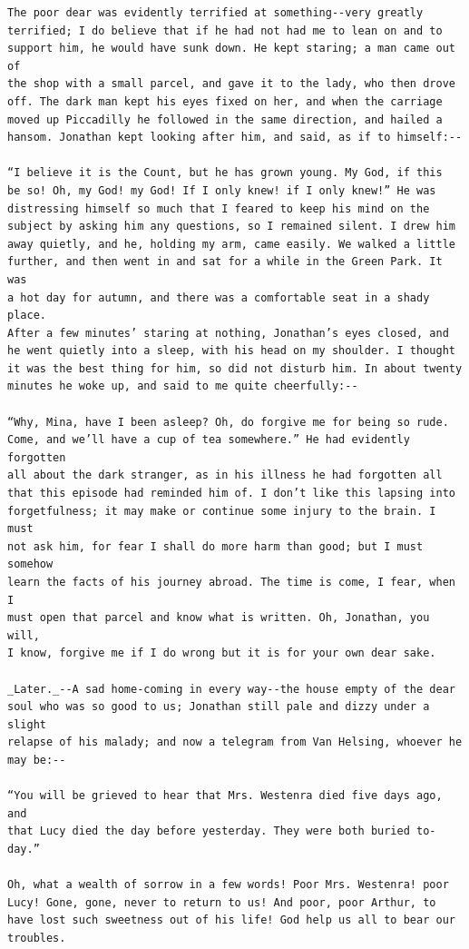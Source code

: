 \documentclass{article}
\begin{document}
\begin{verbatim}
The poor dear was evidently terrified at something--very greatly
terrified; I do believe that if he had not had me to lean on and to
support him, he would have sunk down. He kept staring; a man came out of
the shop with a small parcel, and gave it to the lady, who then drove
off. The dark man kept his eyes fixed on her, and when the carriage
moved up Piccadilly he followed in the same direction, and hailed a
hansom. Jonathan kept looking after him, and said, as if to himself:--

“I believe it is the Count, but he has grown young. My God, if this
be so! Oh, my God! my God! If I only knew! if I only knew!” He was
distressing himself so much that I feared to keep his mind on the
subject by asking him any questions, so I remained silent. I drew him
away quietly, and he, holding my arm, came easily. We walked a little
further, and then went in and sat for a while in the Green Park. It was
a hot day for autumn, and there was a comfortable seat in a shady place.
After a few minutes’ staring at nothing, Jonathan’s eyes closed, and
he went quietly into a sleep, with his head on my shoulder. I thought
it was the best thing for him, so did not disturb him. In about twenty
minutes he woke up, and said to me quite cheerfully:--

“Why, Mina, have I been asleep? Oh, do forgive me for being so rude.
Come, and we’ll have a cup of tea somewhere.” He had evidently forgotten
all about the dark stranger, as in his illness he had forgotten all
that this episode had reminded him of. I don’t like this lapsing into
forgetfulness; it may make or continue some injury to the brain. I must
not ask him, for fear I shall do more harm than good; but I must somehow
learn the facts of his journey abroad. The time is come, I fear, when I
must open that parcel and know what is written. Oh, Jonathan, you will,
I know, forgive me if I do wrong but it is for your own dear sake.

_Later._--A sad home-coming in every way--the house empty of the dear
soul who was so good to us; Jonathan still pale and dizzy under a slight
relapse of his malady; and now a telegram from Van Helsing, whoever he
may be:--

“You will be grieved to hear that Mrs. Westenra died five days ago, and
that Lucy died the day before yesterday. They were both buried to-day.”

Oh, what a wealth of sorrow in a few words! Poor Mrs. Westenra! poor
Lucy! Gone, gone, never to return to us! And poor, poor Arthur, to
have lost such sweetness out of his life! God help us all to bear our
troubles.



\end{verbatim}
\end{document}
